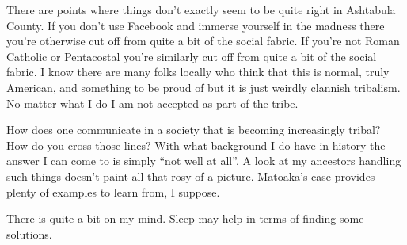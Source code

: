 There are points where things don't exactly seem to be quite right in
Ashtabula County. If you don't use Facebook and immerse yourself in the
madness there you're otherwise cut off from quite a bit of the social
fabric. If you're not Roman Catholic or Pentacostal you're similarly cut
off from quite a bit of the social fabric. I know there are many folks
locally who think that this is normal, truly American, and something to
be proud of but it is just weirdly clannish tribalism. No matter what I
do I am not accepted as part of the tribe.

How does one communicate in a society that is becoming increasingly
tribal? How do you cross those lines? With what background I do have in
history the answer I can come to is simply ``not well at all''. A look
at my ancestors handling such things doesn't paint all that rosy of a
picture. Matoaka's case provides plenty of examples to learn from, I
suppose.

There is quite a bit on my mind. Sleep may help in terms of finding some
solutions.
